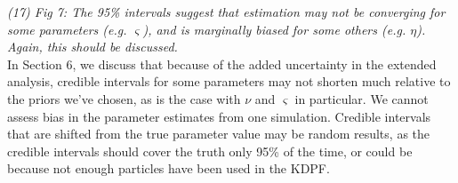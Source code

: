 \documentclass{article}
\begin{document}
\noindent \emph{(17) Fig 7: The 95\% intervals suggest that estimation may not be converging for some parameters (e.g. $\varsigma$), and is marginally biased for some others (e.g. $\eta$). Again, this should be discussed.} \\

In Section 6, we discuss that because of the added uncertainty in the extended analysis, credible intervals for some parameters may not shorten much relative to the priors we've chosen, as is the case with $\nu$ and $\varsigma$ in particular. We cannot assess bias in the parameter estimates from one simulation. Credible intervals that are shifted from the true parameter value may be random results, as the credible intervals should cover the truth only 95\% of the time, or could be because not enough particles have been used in the KDPF. \\
\end{document}
